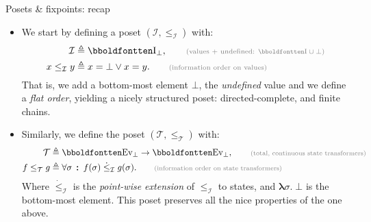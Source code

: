 \documentclass[aspectratio=169]{beamer}
\begin{document}
\begin{frame}{Posets \& fixpoints: recap}
  \vspace*{-1em}
  \begin{itemize}
  \item We start by defining a poset $(\mathcal{I},\leq_{\mathcal{I}})$ with:
    \begin{align*}
    \mathcal{I} &\triangleq \mathbb{I}_\bot,\tag*{\scriptsize\color{gray} (values + undefined: $\mathbb{I} \cup \bot$)}\\
    x \leq_{\mathcal{I}} y &\triangleq x = \bot \vee x = y.\tag*{\scriptsize\color{gray} (information order on values)}
    \end{align*}
    That is, we add a bottom-most element $\bot$, the \emph{undefined}
    value and we define a \emph{flat order}, yielding a nicely
    structured poset: directed-complete, and finite chains.
  \end{itemize}
  \begin{center}
  \end{center}
  \begin{itemize}
    \pause\item Similarly, we define the poset $(\mathcal{T},\leq_{\mathcal{T}})$
    with:
    \begin{align*}
    \mathcal{T} &\triangleq \mathbb{Ev}_\bot \to \mathbb{Ev}_\bot,\tag*{\scriptsize\color{gray} (total, continuous state transformers)}\\
      f \leq_{\mathcal{T}} g &\triangleq \forall \sigma\:\pmb{:}\: f(\sigma) \; \dot{\leq}_{\mathcal{I}} \; g(\sigma).\tag*{\scriptsize\color{gray} (information order on state transformers)}
    \end{align*}
    Where $\dot{\leq}_{\mathcal{I}}$ is the \emph{point-wise extension} of $\leq_{\mathcal{I}}$ to states, and
    $\pmb{\lambda}\sigma\pmb{.}\; \bot$ is the bottom-most element.
    This poset preserves all the nice properties of the one above.
  \end{itemize}
\end{frame}
\end{document}
